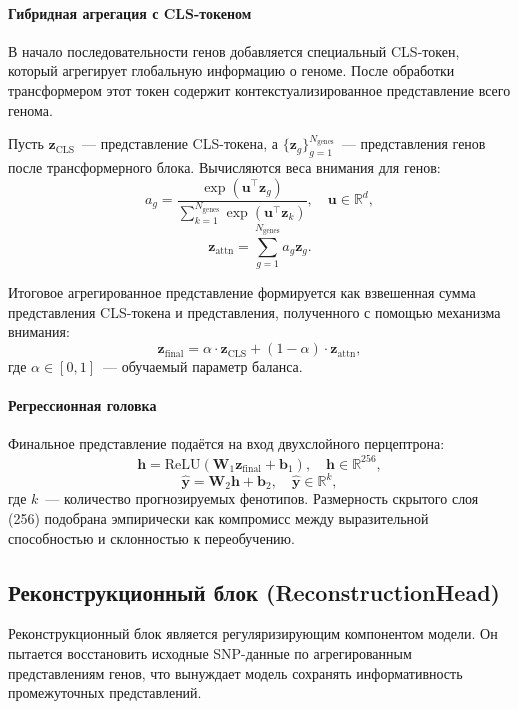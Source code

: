 \paragraph{Гибридная агрегация с CLS-токеном}

В начало последовательности генов добавляется специальный CLS-токен, 
который агрегирует глобальную информацию о геноме. После обработки 
трансформером этот токен содержит контекстуализированное представление 
всего генома.

Пусть $\mathbf{z}_{\text{CLS}}$~--- представление CLS-токена, а 
$\{\mathbf{z}_g\}_{g=1}^{N_{\text{genes}}}$~--- представления генов после 
трансформерного блока. Вычисляются веса внимания для генов:
\[
a_g = \frac{\exp(\mathbf{u}^{\top} \mathbf{z}_g)}{\sum_{k=1}^{N_{\text{genes}}} 
	\exp(\mathbf{u}^{\top} \mathbf{z}_k)}, \quad \mathbf{u} \in \mathbb{R}^d,
\]
\[
\mathbf{z}_{\text{attn}} = \sum_{g=1}^{N_{\text{genes}}} a_g \mathbf{z}_g.
\]

Итоговое агрегированное представление формируется как взвешенная сумма 
представления CLS-токена и представления, полученного с помощью механизма 
внимания:
\[
\mathbf{z}_{\text{final}} = \alpha \cdot \mathbf{z}_{\text{CLS}} + 
(1 - \alpha) \cdot \mathbf{z}_{\text{attn}},
\]
где $\alpha \in [0,1]$~--- обучаемый параметр баланса.

\paragraph{Регрессионная головка}

Финальное представление подаётся на вход двухслойного перцептрона:
\[
\mathbf{h} = \text{ReLU}(\mathbf{W}_1 \mathbf{z}_{\text{final}} + \mathbf{b}_1), \quad
\mathbf{h} \in \mathbb{R}^{256},
\]
\[
\hat{\mathbf{y}} = \mathbf{W}_2 \mathbf{h} + \mathbf{b}_2, \quad
\hat{\mathbf{y}} \in \mathbb{R}^k,
\]
где $k$~--- количество прогнозируемых фенотипов. Размерность скрытого слоя 
(256) подобрана эмпирически как компромисс между выразительной способностью 
и склонностью к переобучению.

\subsection{Реконструкционный блок (ReconstructionHead)}

Реконструкционный блок является регуляризирующим компонентом модели. Он 
пытается восстановить исходные SNP-данные по агрегированным представлениям 
генов, что вынуждает модель сохранять информативность промежуточных 
представлений.

